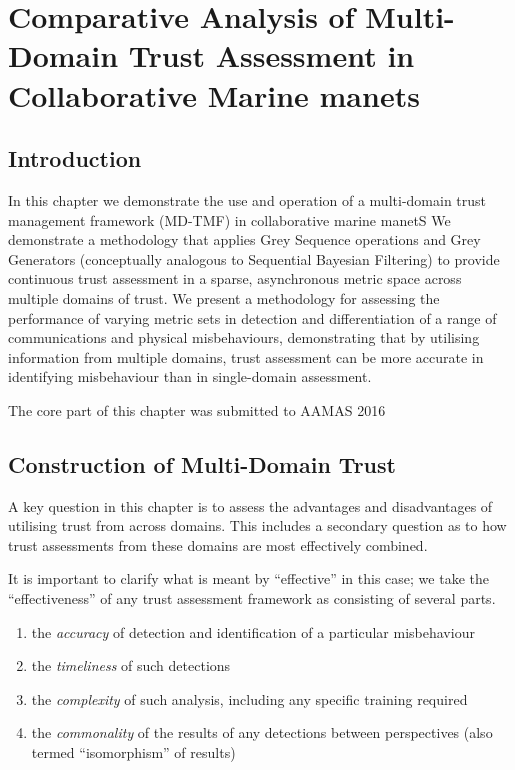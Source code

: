 \def\ChapterTitle{Comparative Analysis of Multi-Domain Trust Assessment in Collaborative Marine \gls{manet}s}

\ifx\ifthesis\undefined

\else
\chapter{\ChapterTitle}
\label{Chapter\thechapter}
\fi

\section{Introduction}



In this chapter we demonstrate the use and operation of a multi-domain trust management framework (MD-TMF) in collaborative marine \gls{manet}S
We demonstrate a methodology that applies Grey Sequence operations and Grey Generators (conceptually analogous to Sequential Bayesian Filtering) to provide continuous trust assessment in a sparse, asynchronous metric space across multiple domains of trust.
We present a methodology for assessing the performance of varying metric sets in detection and differentiation of a range of communications and physical misbehaviours, demonstrating that by utilising information from multiple domains, trust assessment can be more accurate in identifying misbehaviour than in single-domain assessment.

The core part of this chapter was submitted to AAMAS 2016

\section{Construction of Multi-Domain Trust}

A key question in this chapter is to assess the advantages and disadvantages of utilising trust from across domains. 
This includes a secondary question as to how trust assessments from these domains are most effectively combined. 

It is important to clarify what is meant by ``effective'' in this case; we take the ``effectiveness'' of any trust assessment framework as consisting of several parts.

\begin{enumerate}
  \item the \emph{accuracy} of detection and identification of a particular misbehaviour
  \item the \emph{timeliness} of such detections
  \item the \emph{complexity} of such analysis, including any specific training required
  \item the \emph{commonality} of the results of any detections between perspectives (also termed ``isomorphism'' of results)
\end{enumerate}




